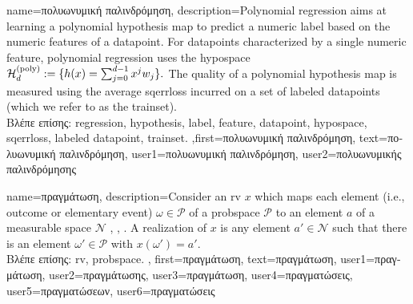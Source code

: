 {name={\foreignlanguage{greek}{πολυωνυμική παλινδρόμηση}}, 
	description={Polynomial 
		\gls{regression} aims at learning a polynomial \gls{hypothesis} map to predict a numeric \gls{label} based
		 on the numeric \gls{feature}s of a \gls{datapoint}. For \gls{datapoint}s characterized by a single 
		 numeric \gls{feature}, polynomial \gls{regression} uses the \gls{hypospace} 
		$\mathcal{H}^{(\rm poly)}_{d} := \{ h(x) = \sum_{j=0}^{d-1} x^{j} w_{j} \}.$
		The quality of a polynomial \gls{hypothesis} map is measured using the average \gls{sqerrloss} 
		incurred on a set of \gls{labeled datapoint}s (which we refer to as the \gls{trainset}).\\
	\foreignlanguage{greek}{Βλέπε επίσης:} \gls{regression}, \gls{hypothesis}, \gls{label}, \gls{feature}, \gls{datapoint}, \gls{hypospace}, \gls{sqerrloss}, \gls{labeled datapoint}, \gls{trainset}.
			},first={\foreignlanguage{greek}{πολυωνυμική παλινδρόμηση}},
			text={\foreignlanguage{greek}{πολυωνυμική παλινδρόμηση}},
			user1={\foreignlanguage{greek}{πολυωνυμική παλινδρόμηση}}, %
			user2={\foreignlanguage{greek}{πολυωνυμικής παλινδρόμησης}} %
}

{name={\foreignlanguage{greek}{πραγμάτωση}},
	description={Consider an \gls{rv} $x$ which maps each element 
		(i.e., outcome or elementary event) $\omega \in \mathcal{P}$ of a \gls{probspace} $\mathcal{P}$ 
		to an element $a$ of a measurable space $\mathcal{N}$ \cite{RudinBookPrinciplesMatheAnalysis}, \cite{BillingsleyProbMeasure}, \cite{HalmosMeasure}. 
		A realization of $x$ is any element $a' \in \mathcal{N}$ such that there is 
		an element $\omega' \in \mathcal{P}$ with $x(\omega') = a'$.\\
	\foreignlanguage{greek}{Βλέπε επίσης:} \gls{rv}, \gls{probspace}.
	}, first={\foreignlanguage{greek}{πραγμάτωση}},
	text={\foreignlanguage{greek}{πραγμάτωση}},
	user1={\foreignlanguage{greek}{πραγμάτωση}}, %
  	user2={\foreignlanguage{greek}{πραγμάτωσης}}, %
	user3={\foreignlanguage{greek}{πραγμάτωση}}, %
  	user4={\foreignlanguage{greek}{πραγματώσεις}}, %
	user5={\foreignlanguage{greek}{πραγματώσεων}}, %
  	user6={\foreignlanguage{greek}{πραγματώσεις}} %
}

